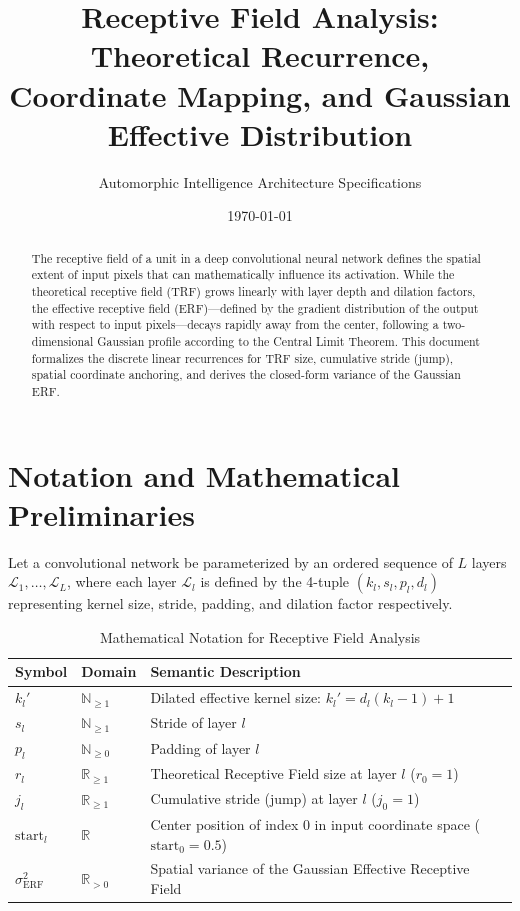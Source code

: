 \documentclass[11pt,a4paper]{article}
\title{Receptive Field Analysis: Theoretical Recurrence, Coordinate Mapping, and Gaussian Effective Distribution}
\author{Automorphic Intelligence Architecture Specifications}
\date{\today}
\theoremstyle{definition}
\begin{document}
\maketitle

\begin{abstract}
The receptive field of a unit in a deep convolutional neural network defines the spatial extent of input pixels that can mathematically influence its activation. While the theoretical receptive field (TRF) grows linearly with layer depth and dilation factors, the effective receptive field (ERF)—defined by the gradient distribution of the output with respect to input pixels—decays rapidly away from the center, following a two-dimensional Gaussian profile according to the Central Limit Theorem. This document formalizes the discrete linear recurrences for TRF size, cumulative stride (jump), spatial coordinate anchoring, and derives the closed-form variance of the Gaussian ERF.
\end{abstract}

\section{Notation and Mathematical Preliminaries}

Let a convolutional network be parameterized by an ordered sequence of $L$ layers $\mathcal{L}_1, \dots, \mathcal{L}_L$, where each layer $\mathcal{L}_l$ is defined by the 4-tuple $(k_l, s_l, p_l, d_l)$ representing kernel size, stride, padding, and dilation factor respectively.

\begin{table}[h]
\centering
\caption{Mathematical Notation for Receptive Field Analysis}
\begin{tabular}{lll}
\toprule
\textbf{Symbol} & \textbf{Domain} & \textbf{Semantic Description} \\
\midrule
$k_l'$ & $\mathbb{N}_{\ge 1}$ & Dilated effective kernel size: $k_l' = d_l (k_l - 1) + 1$ \\
$s_l$ & $\mathbb{N}_{\ge 1}$ & Stride of layer $l$ \\
$p_l$ & $\mathbb{N}_{\ge 0}$ & Padding of layer $l$ \\
$r_l$ & $\mathbb{R}_{\ge 1}$ & Theoretical Receptive Field size at layer $l$ ($r_0 = 1$) \\
$j_l$ & $\mathbb{R}_{\ge 1}$ & Cumulative stride (jump) at layer $l$ ($j_0 = 1$) \\
$\text{start}_l$ & $\mathbb{R}$ & Center position of index 0 in input coordinate space ($\text{start}_0 = 0.5$) \\
$\sigma_{\text{ERF}}^2$ & $\mathbb{R}_{> 0}$ & Spatial variance of the Gaussian Effective Receptive Field \\
\bottomrule
\end{tabular}
\end{table}
\end{document}
